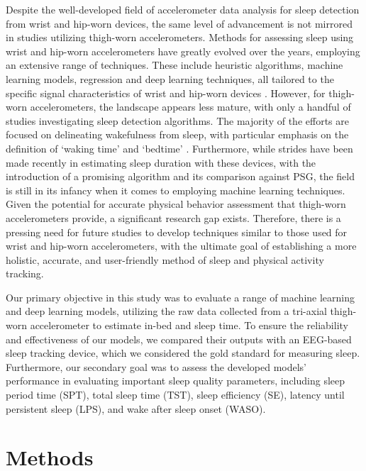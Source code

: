 \documentclass[
  super,
  preprint,
  3p]{elsarticle}
\begin{document}
Despite the well-developed field of accelerometer data analysis for
sleep detection from wrist and hip-worn devices, the same level of
advancement is not mirrored in studies utilizing thigh-worn
accelerometers. Methods for assessing sleep using wrist and hip-worn
accelerometers have greatly evolved over the years, employing an
extensive range of techniques. These include heuristic algorithms,
machine learning models, regression and deep learning techniques, all
tailored to the specific signal characteristics of wrist and hip-worn
devices
\citep{palotti2019, cole1992, sazonov2004, sadeh1994, hees2015, sundararajan2021, patterson_40_2023}.
However, for thigh-worn accelerometers, the landscape appears less
mature, with only a handful of studies investigating sleep detection
algorithms. The majority of the efforts are focused on delineating
wakefulness from sleep, with particular emphasis on the definition of
`waking time' and `bedtime'
\citep{carlson2021, inan-eroglu2021, vanderberg2016, winkler2016}.
Furthermore, while strides have been made recently in estimating sleep
duration with these devices, with the introduction of a promising
algorithm and its comparison against
PSG\citep{johansson_development_2023}, the field is still in its infancy
when it comes to employing machine learning techniques. Given the
potential for accurate physical behavior assessment that thigh-worn
accelerometers provide\citep{skotte_detection_2014, arvidsson2019}, a
significant research gap exists. Therefore, there is a pressing need for
future studies to develop techniques similar to those used for wrist and
hip-worn accelerometers, with the ultimate goal of establishing a more
holistic, accurate, and user-friendly method of sleep and physical
activity tracking.

Our primary objective in this study was to evaluate a range of machine
learning and deep learning models, utilizing the raw data collected from
a tri-axial thigh-worn accelerometer to estimate in-bed and sleep time.
To ensure the reliability and effectiveness of our models, we compared
their outputs with an EEG-based sleep tracking device, which we
considered the gold standard for measuring sleep. Furthermore, our
secondary goal was to assess the developed models' performance in
evaluating important sleep quality parameters, including sleep period
time (SPT), total sleep time (TST), sleep efficiency (SE), latency until
persistent sleep (LPS), and wake after sleep onset (WASO).

\hypertarget{methods}{%
\section{Methods}\label{methods}}
\end{document}
